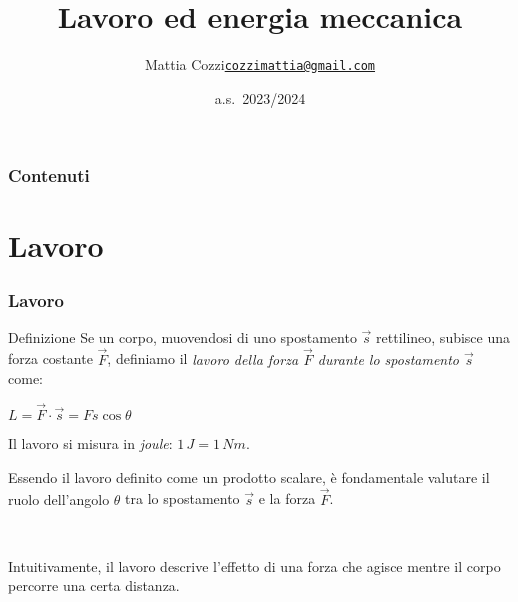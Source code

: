 \documentclass[]{beamer}
\title{Lavoro ed energia meccanica}
\author{\texorpdfstring{Mattia Cozzi\newline\href{mailto:cozzimattia@gmail.com}{\texttt{cozzimattia@gmail.com}}}{Mattia Cozzi}}
\date{a.s.~2023/2024}
\theoremstyle{plain}
\begin{document}
\begin{frame}
  \titlepage
\end{frame}





\begin{frame}
\frametitle{Contenuti}
\tableofcontents
\end{frame}


\section{Lavoro}


\begin{frame}
  \frametitle{Lavoro}
  \begin{block}{Definizione}
Se un corpo, muovendosi di uno spostamento $ \vec{s} $ rettilineo, subisce una forza costante $ \vec{F} $, definiamo il \emph{lavoro della forza $ \vec{F} $ durante lo spostamento $ \vec{s} $} come:
\begin{center}
\colorbox{marroncino!30}{$ L = \vec{F} \cdot \vec{s} = Fs\cos\theta $}
\end{center}
Il lavoro si misura in \emph{joule}: $ 1 \, J = 1 \, Nm $.
\end{block}\pause
Essendo il lavoro definito come un prodotto scalare, è fondamentale valutare il \alert<2>{ruolo dell'angolo $ \theta $} tra lo spostamento $ \vec{s} $ e la forza $ \vec{F} $.\pause

~

Intuitivamente, il lavoro descrive \alert<3>{l'effetto di una forza che agisce mentre il corpo percorre una certa distanza}.
\end{frame}
\end{document}
